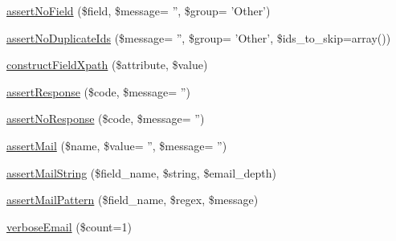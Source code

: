 \begin{DoxyCompactItemize}
\item 
\hyperlink{classDrupalWebTestCase_a450b5b0be6615e14e94415e087c31706}{assertNoField} (\$field, \$message= '', \$group= 'Other')
\item 
\hyperlink{classDrupalWebTestCase_ab42872d80b96a79026d064c5bcf67138}{assertNoDuplicateIds} (\$message= '', \$group= 'Other', \$ids\_\-to\_\-skip=array())
\item 
\hyperlink{classDrupalWebTestCase_afec52d7a3b6e492c3230dcc2b22bd7bb}{constructFieldXpath} (\$attribute, \$value)
\item 
\hyperlink{classDrupalWebTestCase_af414857cce5491ca01a2f7ea9d2d60bf}{assertResponse} (\$code, \$message= '')
\item 
\hyperlink{classDrupalWebTestCase_a0e47bffd70302e2fc2998094e619bb5f}{assertNoResponse} (\$code, \$message= '')
\item 
\hyperlink{classDrupalWebTestCase_ad318f30726058caea940c1aeed1bd182}{assertMail} (\$name, \$value= '', \$message= '')
\item 
\hyperlink{classDrupalWebTestCase_afbd0be3cf23c01e113803bf4b475eecc}{assertMailString} (\$field\_\-name, \$string, \$email\_\-depth)
\item 
\hyperlink{classDrupalWebTestCase_a1ed753cc3b38d927ab50b26e6a8dd7b1}{assertMailPattern} (\$field\_\-name, \$regex, \$message)
\item 
\hyperlink{classDrupalWebTestCase_a5b95ca547399234a008fe0aabd7ba830}{verboseEmail} (\$count=1)
\end{DoxyCompactItemize}

